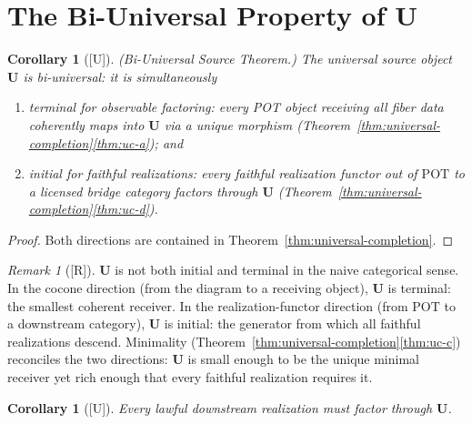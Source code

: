 \documentclass[12pt,oneside]{amsbook}
\theoremstyle{plain}
\newtheorem{corollary}[theorem]{Corollary}
\theoremstyle{definition}
\theoremstyle{remark}
\newtheorem{remark}[theorem]{Remark}
\newcommand{\status}[1]{\textup{[#1]}}
\begin{document}
\section{The Bi-Universal Property of $\mathbf{U}$}

\begin{corollary}[\status{U}]\label{cor:biU}
\textup{(Bi-Universal Source Theorem.)}  The universal source object
$\mathbf{U}$ is bi-universal: it is simultaneously
\begin{enumerate}[label=\textup{(\roman*)}]
  \item \emph{terminal for observable factoring}: every POT object
        receiving all fiber data coherently maps into $\mathbf{U}$
        via a unique morphism (Theorem~\ref{thm:universal-completion}\ref{thm:uc-a});
        and
  \item \emph{initial for faithful realizations}: every faithful
        realization functor out of $\mathrm{POT}$ to a licensed
        bridge category factors through $\mathbf{U}$
        (Theorem~\ref{thm:universal-completion}\ref{thm:uc-d}).
\end{enumerate}
\end{corollary}

\begin{proof}
Both directions are contained in Theorem~\ref{thm:universal-completion}.
\end{proof}

\begin{remark}[\status{R}]\label{rmk:biU-not-initial-terminal}
$\mathbf{U}$ is not both initial and terminal in the naive categorical
sense.  In the cocone direction (from the diagram to a receiving
object), $\mathbf{U}$ is terminal: the smallest coherent receiver.  In
the realization-functor direction (from $\mathrm{POT}$ to a downstream
category), $\mathbf{U}$ is initial: the generator from which all
faithful realizations descend.  Minimality
(Theorem~\ref{thm:universal-completion}\ref{thm:uc-c}) reconciles the
two directions: $\mathbf{U}$ is small enough to be the unique minimal
receiver yet rich enough that every faithful realization requires it.
\end{remark}

\begin{corollary}[\status{U}]\label{cor:descendants-factor}
Every lawful downstream realization must factor through $\mathbf{U}$.
\end{corollary}
\end{document}
